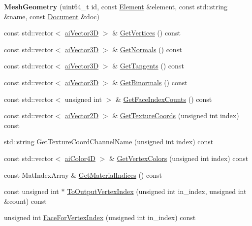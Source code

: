 \begin{DoxyCompactItemize}
\item 
\hypertarget{class_assimp_1_1_f_b_x_1_1_mesh_geometry_a1ef03b9131a3604c6b663ecaa8d5288a}{{\bfseries Mesh\+Geometry} (uint64\+\_\+t id, const \hyperlink{class_assimp_1_1_f_b_x_1_1_element}{Element} \&element, const std\+::string \&name, const \hyperlink{class_assimp_1_1_f_b_x_1_1_document}{Document} \&doc)}\label{class_assimp_1_1_f_b_x_1_1_mesh_geometry_a1ef03b9131a3604c6b663ecaa8d5288a}

\item 
const std\+::vector$<$ \hyperlink{structai_vector3_d}{ai\+Vector3\+D} $>$ \& \hyperlink{class_assimp_1_1_f_b_x_1_1_mesh_geometry_ae5733b882589ef15968a8df954ad0198}{Get\+Vertices} () const 
\item 
const std\+::vector$<$ \hyperlink{structai_vector3_d}{ai\+Vector3\+D} $>$ \& \hyperlink{class_assimp_1_1_f_b_x_1_1_mesh_geometry_a99c02000e681b2cabfe771666c0c08b0}{Get\+Normals} () const 
\item 
const std\+::vector$<$ \hyperlink{structai_vector3_d}{ai\+Vector3\+D} $>$ \& \hyperlink{class_assimp_1_1_f_b_x_1_1_mesh_geometry_a6bb257d0ba5b1b66283cd3a65d5d5d42}{Get\+Tangents} () const 
\item 
const std\+::vector$<$ \hyperlink{structai_vector3_d}{ai\+Vector3\+D} $>$ \& \hyperlink{class_assimp_1_1_f_b_x_1_1_mesh_geometry_abea69ee28119b5051030bcdc44f671a9}{Get\+Binormals} () const 
\item 
const std\+::vector$<$ unsigned int $>$ \& \hyperlink{class_assimp_1_1_f_b_x_1_1_mesh_geometry_a8f1a6307a9e5930d3a257c7ff6062784}{Get\+Face\+Index\+Counts} () const 
\item 
const std\+::vector$<$ \hyperlink{structai_vector2_d}{ai\+Vector2\+D} $>$ \& \hyperlink{class_assimp_1_1_f_b_x_1_1_mesh_geometry_ad171dff1b33d7a5a831643261c3dbc95}{Get\+Texture\+Coords} (unsigned int index) const 
\item 
std\+::string \hyperlink{class_assimp_1_1_f_b_x_1_1_mesh_geometry_af029bb115da003d817c317f4582d38d6}{Get\+Texture\+Coord\+Channel\+Name} (unsigned int index) const 
\item 
const std\+::vector$<$ \hyperlink{structai_color4_d}{ai\+Color4\+D} $>$ \& \hyperlink{class_assimp_1_1_f_b_x_1_1_mesh_geometry_ab3458f4cc0affa6bee580faf4023b280}{Get\+Vertex\+Colors} (unsigned int index) const 
\item 
const Mat\+Index\+Array \& \hyperlink{class_assimp_1_1_f_b_x_1_1_mesh_geometry_a4f55a167372c635d2b3aee3a04219a8b}{Get\+Material\+Indices} () const 
\item 
const unsigned int $\ast$ \hyperlink{class_assimp_1_1_f_b_x_1_1_mesh_geometry_a3d25bed50b9a4f8313ac473d0601fe60}{To\+Output\+Vertex\+Index} (unsigned int in\+\_\+index, unsigned int \&count) const 
\item 
unsigned int \hyperlink{class_assimp_1_1_f_b_x_1_1_mesh_geometry_af21da4fdd3b0b1da4dd4b0e5ca6acc24}{Face\+For\+Vertex\+Index} (unsigned int in\+\_\+index) const 
\end{DoxyCompactItemize}
